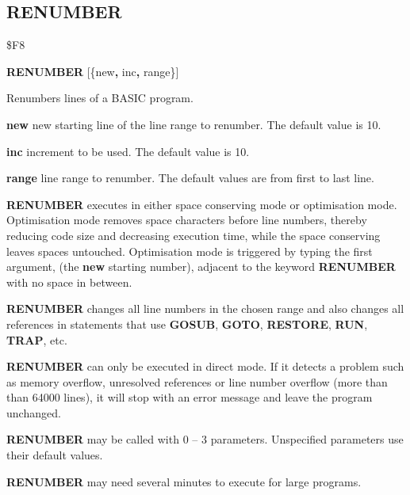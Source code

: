 \subsection{RENUMBER}
\begin{description}[leftmargin=2cm,style=nextline]
\item [Token:] \$F8
\item [Format:] {\bf RENUMBER} [\{new{\bf,} inc{\bf,} range\}]
\item [Usage:] Renumbers lines of a BASIC program.

               {\bf new} new starting line of the
               line range to renumber.
               The default value is 10.

               {\bf inc} increment to be used.
               The default value is 10.

               {\bf range} line range to renumber.
               The default values are from first to last line.

               {\bf RENUMBER} executes in either space conserving mode
               or optimisation mode. Optimisation mode removes space
               characters before line numbers, thereby reducing code size
               and decreasing execution time, while the space conserving
               leaves spaces untouched. Optimisation mode is triggered
               by typing the first argument, (the {\bf new} starting number),
               adjacent to the keyword {\bf RENUMBER} with no space in
               between.

               {\bf RENUMBER} changes all line numbers in
               the chosen range and also changes all references
               in statements that use {\bf GOSUB}, {\bf GOTO},
               {\bf RESTORE}, {\bf RUN}, {\bf TRAP}, etc.

               {\bf RENUMBER} can only be executed in direct mode.
               If it detects a problem such as memory overflow,
               unresolved references or line number overflow
               (more than than 64000 lines), it will stop with an error
               message and leave the program unchanged.

               {\bf RENUMBER} may be called with 0 -- 3 parameters.
               Unspecified parameters use their default values.

\item [Remarks:] {\bf RENUMBER} may need several
                 minutes to execute for large programs.


\end{description}
